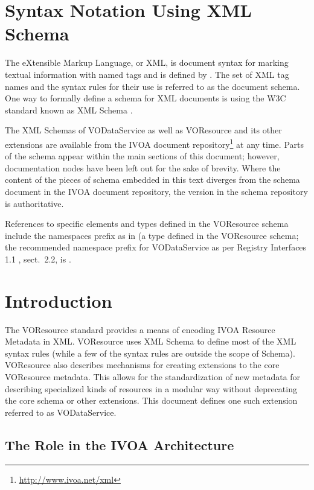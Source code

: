 \documentclass[11pt,a4paper]{ivoa}
\begin{document}
\section*{Syntax Notation Using XML Schema}

The eXtensible Markup Language, or XML, is document syntax for marking
textual information with named tags and is defined by \citet{std:XML}.
The set of XML tag names and the syntax
rules for their use is referred to as the document schema.  One way to
formally define a schema for XML documents is using the W3C standard
known as XML Schema \citep{std:XSD}.

The XML Schemas of VODataService as well as VOResource and its other
extensions are
available from the IVOA document
repository\footnote{\url{http://www.ivoa.net/xml}} at any time.
Parts of the schema appear within the main sections of this document;
however, documentation nodes have been left out for the sake of brevity.
Where the content of the pieces of schema embedded in this text
diverges from the schema document in the IVOA document
repository, the version in the schema repository is authoritative.

References to specific elements and types defined in the VOResource
schema include the namespaces prefix  as in
 (a type defined in the VOResource schema; the
recommended namespace prefix for VODataService as per Registry
Interfaces 1.1 \citep{todo:RI1.1}, sect.~2.2, is .

\section{Introduction}

The VOResource standard \citep{todo:VOR1.1} provides a means of
encoding IVOA Resource Metadata in XML.
VOResource uses XML Schema \citep{std:XSD} to define
most of the XML syntax rules (while a few of the syntax rules are
outside the scope of Schema).  VOResource also describes mechanisms
for creating extensions to the core VOResource metadata.  This allows
for the standardization of new metadata for describing specialized
kinds of resources in a modular way without deprecating the core
schema or other extensions.  This document defines one such extension
referred to as VODataService.

\subsection{The Role in the IVOA Architecture}
\end{document}
